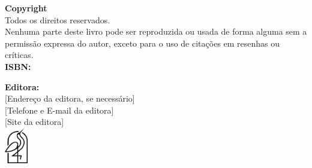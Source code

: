 \cleardoublepage %
\thispagestyle{empty} %
\vspace*{\fill} %

\begin{center}
	\begin{minipage}{0.8\textwidth}
		\linespread{1.1}\selectfont %
		
		\footnotesize %
		
		\textbf{Copyright \textcopyright\ \the\year\ \authorname} \\
		Todos os direitos reservados. \\
		Nenhuma parte deste livro pode ser reproduzida ou usada de forma alguma sem a permissão expressa do autor, exceto para o uso de citações em resenhas ou críticas. \\[1em]
		
		\ifx\isbn\undefined\else
		\textbf{ISBN:} \isbn \\[1em]
		\fi
		
		\textbf{Editora:} \publisher \\[0.5em]
		[Endereço da editora, se necessário] \\[0.5em]
		[Telefone e E-mail da editora] \\[0.5em]
		[Site da editora] \\[2em]
		
		\includegraphics[width=1cm]{frontmatter/logo-black.png} %
		
	\end{minipage}
\end{center}

\vspace*{\fill} %
\cleardoublepage %